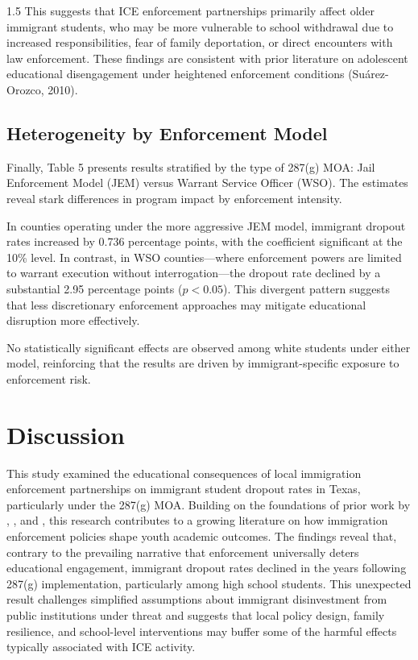 \documentclass[12pt]{article}
\begin{document}
\begin{spacing}{1.5}
This suggests that ICE enforcement partnerships primarily affect older immigrant students, who may be more vulnerable to school withdrawal due to increased responsibilities, fear of family deportation, or direct encounters with law enforcement. These findings are consistent with prior literature on adolescent educational disengagement under heightened enforcement conditions (Suárez-Orozco, 2010).


\subsection{Heterogeneity by Enforcement Model}
Finally, Table 5 presents results stratified by the type of 287(g) MOA: Jail Enforcement Model (JEM) versus Warrant Service Officer (WSO). The estimates reveal stark differences in program impact by enforcement intensity.


In counties operating under the more aggressive JEM model, immigrant dropout rates increased by 0.736 percentage points, with the coefficient significant at the 10\% level. In contrast, in WSO counties—where enforcement powers are limited to warrant execution without interrogation—the dropout rate declined by a substantial 2.95 percentage points ($p < 0.05$). This divergent pattern suggests that less discretionary enforcement approaches may mitigate educational disruption more effectively.

No statistically significant effects are observed among white students under either model, reinforcing that the results are driven by immigrant-specific exposure to enforcement risk. 

\section{Discussion}
This study examined the educational consequences of local immigration enforcement partnerships on immigrant student dropout rates in Texas, particularly under the 287(g) MOA. Building on the foundations of prior work by \citet{dee2020}, \citet{amuedo2015}, and \citet{suarez2010}, this research contributes to a growing literature on how immigration enforcement policies shape youth academic outcomes. The findings reveal that, contrary to the prevailing narrative that enforcement universally deters educational engagement, immigrant dropout rates declined in the years following 287(g) implementation, particularly among high school students. This unexpected result challenges simplified assumptions about immigrant disinvestment from public institutions under threat and suggests that local policy design, family resilience, and school-level interventions may buffer some of the harmful effects typically associated with ICE activity.


\end{spacing}
\end{document}
